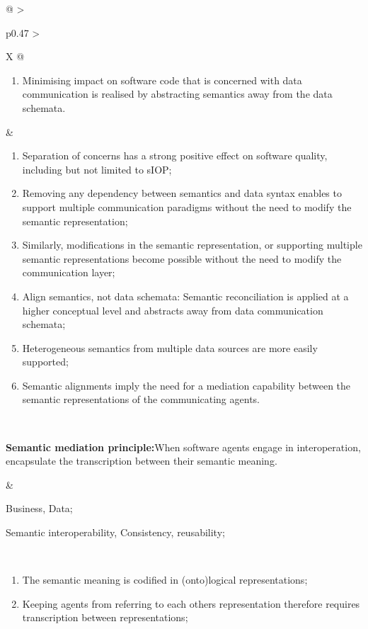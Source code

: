 \begin{xltabular}[l]{\linewidth}{@{} >{\small\raggedright\arraybackslash}p{0.47\linewidth} >{\small\raggedright\arraybackslash}X @{}}
\begin{enumerate}[left=6pt, nosep]
  \item Minimising impact on software code that is concerned with data communication is realised by abstracting semantics away from the data schemata.
\end{enumerate}
&
\begin{enumerate}[left=10pt, nosep]
  \item Separation of concerns has a strong positive effect on software quality, including but not limited to sIOP;
  \item Removing any dependency between semantics and data syntax enables to support multiple communication paradigms without the need to modify the semantic representation;
  \item Similarly, modifications in the semantic representation, or supporting multiple semantic representations become possible without the need to modify the communication layer;
  \item Align semantics, not data schemata: Semantic reconciliation is applied at a higher conceptual level and abstracts away from data communication schemata;
  \item Heterogeneous semantics from multiple data sources are more easily supported;
  \item Semantic alignments imply the need for a mediation capability between the semantic representations of the communicating agents.
\end{enumerate} \\
%
%
%
\begin{mmdp}\label{dp:mediation}{\bfseries Semantic mediation principle:}\quad When software agents engage in interoperation, encapsulate the transcription between their semantic meaning.\end{mmdp}
&
\begin{description}[labelwidth=3.7cm,leftmargin=3.7cm+1ex,nosep,topsep=2ex,labelsep=1ex,font=\bfseries]
\item[Type of information:] Business, Data;
\item[Quality attributes:] Semantic interoperability, Consistency, reusability;
\end{description} \\
\begin{enumerate}[left=6pt, nosep]
  \item The semantic meaning is codified in (onto)logical representations;
  \item Keeping agents from referring to each others representation therefore requires transcription between representations;

\end{enumerate}
\end{xltabular}
